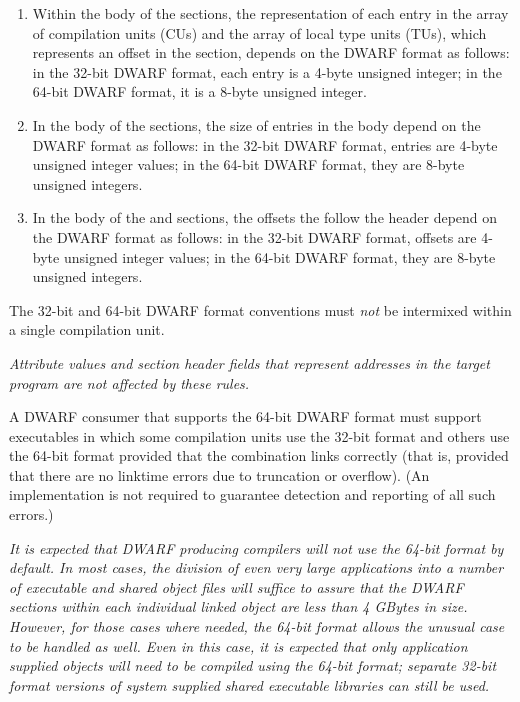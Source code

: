 \begin{enumerate}[1. ]
\item Within the body of the \dotdebugnames{} 
sections, the representation of each entry in the array of
compilation units (CUs) and the array of local type units
(TUs), which represents an offset in the 
\dotdebuginfo{}
section, depends on the DWARF format as follows: in the
32-bit DWARF format, each entry is a 4-byte unsigned integer;
in the 64-bit DWARF format, it is a 8-byte unsigned integer.

\item In the body of the \dotdebugstroffsets{} 
sections, the size of entries in the body depend on the DWARF
format as follows: in the 32-bit DWARF format, entries are 4-byte
unsigned integer values; in the 64-bit DWARF format, they are
8-byte unsigned integers.


\item In the body of the \dotdebugloclists{} and \dotdebugrnglists{}
sections, the offsets the follow the header depend on the
DWARF format as follows: in the 32-bit DWARF format, offsets are 4-byte
unsigned integer values; in the 64-bit DWARF format, they are
8-byte unsigned integers.

\end{enumerate}


The 32-bit and 64-bit DWARF format conventions must \emph{not} be
intermixed within a single compilation unit.

\textit{Attribute values and section header fields that represent
addresses in the target program are not affected by these
rules.}

A DWARF consumer that supports the 64-bit DWARF format must
support executables in which some compilation units use the
32-bit format and others use the 64-bit format provided that
the combination links correctly (that is, provided that there
are no link\dash time errors due to truncation or overflow). (An
implementation is not required to guarantee detection and
reporting of all such errors.)

\textit{It is expected that DWARF producing compilers will \emph{not} use
the 64-bit format \emph{by default}. In most cases, the division of
even very large applications into a number of executable and
shared object files will suffice to assure that the DWARF sections
within each individual linked object are less than 4 GBytes
in size. However, for those cases where needed, the 64-bit
format allows the unusual case to be handled as well. Even
in this case, it is expected that only application supplied
objects will need to be compiled using the 64-bit format;
separate 32-bit format versions of system supplied shared
executable libraries can still be used.}


